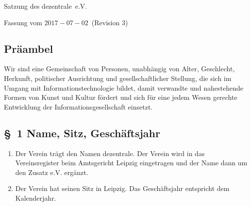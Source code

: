 \documentclass[10pt,a4paper]{scrartcl}
\newcommand{\qs}[1]{\glqq#1\grqq}
\newcommand{\name}{dezentrale}
\newcommand{\revision}{$3$}
\newcommand{\revdate}{$2017-07-02$}
\begin{document}
{\LARGE Satzung des \name\ e.V.}

Fassung vom \revdate\ (Revision \revision)

\subsection*{Pr{\"a}ambel}



Wir sind eine Gemeinschaft von Personen, unabh{\"a}ngig von Alter,
Geschlecht, Herkunft, politischer Ausrichtung und gesellschaftlicher
Stellung, die sich im Umgang mit Informationstechnologie bildet, damit
verwandte und nahestehende Formen von Kunst und Kultur f{\"o}rdert und sich f{\"u}r
eine jedem Wesen gerechte Entwicklung der Informationsgesellschaft
einsetzt.
%
%
\subsection*{\S \ 1 Name, Sitz, Gesch{\"a}ftsjahr}
\begin{enumerate}
\item Der Verein tr{\"a}gt den Namen \qs{\name}. Der Verein wird in das
Vereinsregister beim Amtsgericht Leipzig eingetragen
und der Name dann um den Zusatz \qs{e.V.} erg{\"a}nzt.
\item Der Verein hat seinen Sitz in Leipzig. Das Gesch{\"a}ftsjahr entspricht
dem Kalenderjahr.
\end{enumerate}
%
%
\end{document}
